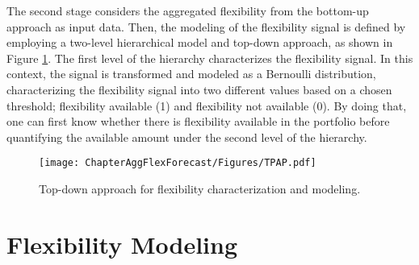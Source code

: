 The second stage considers the aggregated flexibility from the bottom-up approach as input data. Then, the modeling of the flexibility signal is defined by employing a two-level hierarchical model and top-down approach, as shown in Figure \ref{fig:top_down}. The first level of the hierarchy characterizes the flexibility signal. In this context, the signal is transformed and modeled as a Bernoulli distribution, characterizing the flexibility signal into two different values based on a chosen threshold; flexibility available (1) and flexibility not available (0). By doing that, one can first know whether there is flexibility available in the portfolio before quantifying the available amount under the second level of the hierarchy. 

\begin{figure}[]
\centerline{\texttt{[image: ChapterAggFlexForecast/Figures/TPAP.pdf]}}
\caption{Top-down approach for flexibility characterization and modeling.}
\label{fig:top_down}
\end{figure}

\section{Flexibility Modeling} \label{Sect:FlexModeling}
